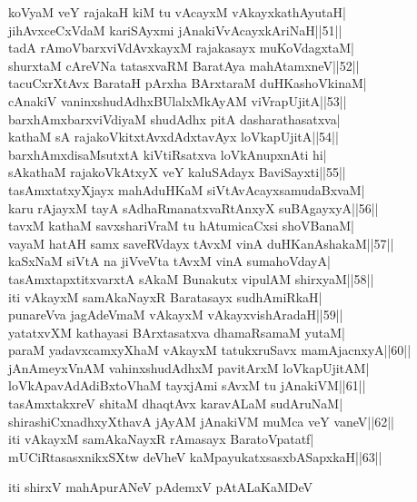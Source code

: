 \documentclass{article}
\begin{document}
koVyaM veY rajakaH kiM tu vAcayxM vAkayxkathAyutaH|\\
jihAvxceCxVdaM kariSAyxmi jAnakiVvAcayxkAriNaH||51||\\
tadA rAmoVbarxviVdAvxkayxM rajakasayx muKoVdagxtaM|\\
shurxtaM cAreVNa tatasxvaRM BaratAya mahAtamxneV||52||\\
tacuCxrXtAvx BarataH pArxha BArxtaraM duHKashoVkinaM|\\
cAnakiV vaninxshudAdhxBUlalxMkAyAM viVrapUjitA||53||\\
barxhAmxbarxviVdiyaM shudAdhx pitA dasharathasatxva|\\
kathaM sA rajakoVkitxtAvxdAdxtavAyx loVkapUjitA||54||\\
barxhAmxdisaMsutxtA kiVtiRsatxva loVkAnupxnAti hi|\\
sAkathaM rajakoVkAtxyX veY kaluSAdayx BaviSayxti||55||\\
tasAmxtatxyXjayx mahAduHKaM siVtAvAcayxsamudaBxvaM|\\
karu rAjayxM tayA sAdhaRmanatxvaRtAnxyX suBAgayxyA||56||\\
tavxM kathaM savxshariVraM tu hAtumicaCxsi shoVBanaM|\\
vayaM hatAH samx saveRVdayx tAvxM vinA duHKanAshakaM||57||\\
kaSxNaM siVtA na jiVveVta tAvxM vinA sumahoVdayA|\\
tasAmxtapxtitxvarxtA sAkaM Bunakutx vipulAM shirxyaM||58||\\
iti vAkayxM samAkaNayxR Baratasayx sudhAmiRkaH|\\
punareVva jagAdeVmaM vAkayxM vAkayxvishAradaH||59||\\
yatatxvXM kathayasi BArxtasatxva dhamaRsamaM yutaM|\\
paraM yadavxcamxyXhaM vAkayxM tatukxruSavx mamAjacnxyA||60||\\
jAnAmeyxVnAM vahinxshudAdhxM pavitArxM loVkapUjitAM|\\
loVkApavAdAdiBxtoVhaM tayxjAmi sAvxM tu jAnakiVM||61||\\
tasAmxtakxreV shitaM dhaqtAvx karavALaM sudAruNaM|\\
shirashiCxnadhxyXthavA jAyAM jAnakiVM muMca veY vaneV||62||\\
iti vAkayxM samAkaNayxR rAmasayx BaratoVpatatf|\\
mUCiRtasasxnikxSXtw deVheV kaMpayukatxsasxbASapxkaH||63||\\

\begin{center}
iti shirxV mahApurANeV pAdemxV pAtALaKaMDeV
\end{center}
\end{document}
